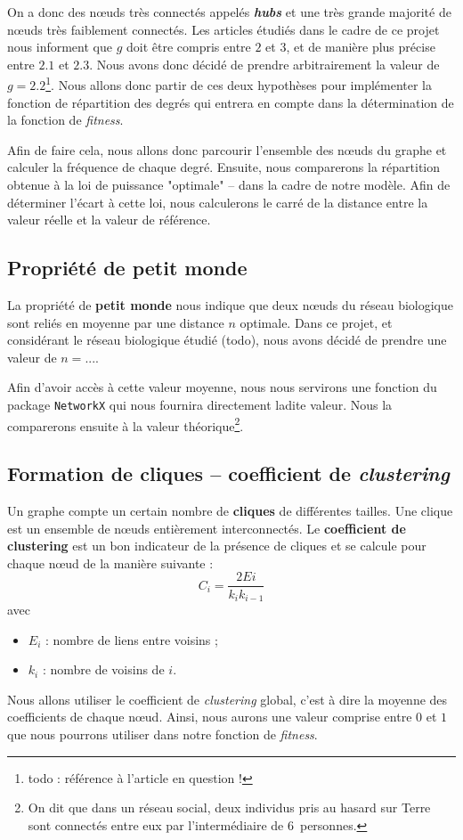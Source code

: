 On a donc des nœuds très connectés appelés \textit{\textbf{hubs}} et une très grande majorité de nœuds très faiblement connectés.	Les articles étudiés dans le cadre de ce projet nous informent que $g$ doit être compris entre $2$ et $3$, et de manière plus précise entre $2.1$ et $2.3$. Nous avons donc décidé de prendre arbitrairement la valeur de $g=2.2$\footnote{todo : référence à l'article en question !}. Nous allons donc partir de ces deux hypothèses pour implémenter la fonction de répartition des degrés qui entrera en compte dans la détermination de la fonction de \textit{fitness}.

Afin de faire cela, nous allons donc parcourir l'ensemble des nœuds du graphe et calculer la fréquence de chaque degré. Ensuite, nous comparerons la répartition obtenue à la loi de puissance "optimale" -- dans la cadre de notre modèle. Afin de déterminer l'écart à cette loi, nous calculerons le carré de la distance entre la valeur réelle et la valeur de référence.

\subsection{Propriété de petit monde}
La propriété de \textbf{petit monde} nous indique que deux nœuds du réseau biologique sont reliés en moyenne par une distance $n$ optimale. Dans ce projet, et considérant le réseau biologique étudié (todo), nous avons décidé de prendre une valeur de $n=...$.

Afin d'avoir accès à cette valeur moyenne, nous nous servirons une fonction du package \verb?NetworkX? qui nous fournira directement ladite valeur. Nous la comparerons ensuite à la valeur théorique\footnote{On dit que dans un réseau social, deux individus pris au hasard sur Terre sont connectés entre eux par l'intermédiaire de $6$~personnes.}.

\subsection{Formation de cliques -- coefficient de \textit{clustering}}
Un graphe compte un certain nombre de \textbf{cliques} de différentes tailles. Une clique est un ensemble de nœuds entièrement interconnectés. Le \textbf{coefficient de clustering} est un bon indicateur de la présence de cliques et se calcule pour chaque nœud de la manière suivante :
$$ C_i = \frac{2Ei}{k_i k_{i-1}} $$
avec
\begin{itemize}
 \item $E_i$ : nombre de liens entre voisins ;
 \item $k_i$ : nombre de voisins de $i$.
\end{itemize}
Nous allons utiliser le coefficient de \textit{clustering} global, c'est à dire la moyenne des coefficients de chaque nœud. Ainsi, nous aurons une valeur comprise entre $0$ et $1$ que nous pourrons utiliser dans notre fonction de \textit{fitness}.


